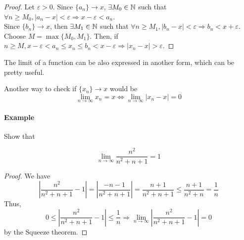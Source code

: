 \begin{proof}
    Let $\varepsilon > 0$. Since $\{a_n\} \to x$, $\exists M_0 \in \mathbb{N}$ such that $\forall n \geq M_0, |a_n-x| < \varepsilon \Rightarrow x-\varepsilon < a_n$.\\
    Since $\{b_n\} \to x$, then $\exists M_1 \in \mathbb{N}$ such that $\forall n \geq M_1, |b_n-x|<\varepsilon \Rightarrow b_n < x + \varepsilon$. \\
    Choose $M = \max\{ M_0, M_1\}$. Then, if $n \geq M, x-\varepsilon < a_n \leq x_n \leq b_n < x-\varepsilon \Rightarrow |x_n-x|>\varepsilon$.
\end{proof}

The limit of a function can be also expressed in another form, which can be pretty useful.

\begin{theorem}
    Another way to check if $\{x_n\} \to x$ would be
    \begin{equation*}
        \lim \limits_{n \to \infty} x_n = x \Longleftrightarrow \lim \limits_{n \to \infty} |x_n - x| = 0
    \end{equation*}
\end{theorem}

\paragraph{Example}

Show that 

\begin{equation*}
    \lim \limits_{n \to \infty} \frac{n^2}{n^2+n+1} = 1
\end{equation*}

\begin{proof}
    We have
    \begin{equation*}
        \left |
            \frac{n^2}{n^2+n+1} - 1
        \right | = 
        \left |
            \frac{-n-1}{n^2+n+1}
        \right | = 
        \frac{n+1}{n^2+n+1} \leq
        \frac{n+1}{n^2+n} = \frac{1}{n}
    \end{equation*}
    Thus,
    \begin{equation*}
        0 \leq 
        \left |
            \frac{n^2}{n^2+n+1} - 1
        \right |
        \leq
        \frac{1}{n}
        \Longrightarrow
        \lim \limits_{n \to \infty}
        \left |
            \frac{n^2}{n^2+n+1} - 1
        \right | = 0
    \end{equation*}
    by the Squeeze theorem.
\end{proof}

